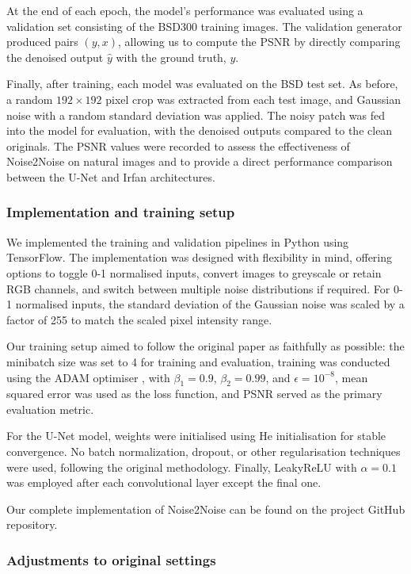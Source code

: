 At the end of each epoch, the model's performance was evaluated using a validation set consisting of the BSD300 training images. The validation generator produced pairs $(y, x)$, allowing us to compute the PSNR by directly comparing the denoised output $\hat{y}$ with the ground truth, $y$.

Finally, after training, each model was evaluated on the BSD test set. As before, a random $192 \times 192$ pixel crop was extracted from each test image, and Gaussian noise with a random standard deviation was applied. The noisy patch was fed into the model for evaluation, with the denoised outputs compared to the clean originals. The PSNR values were recorded to assess the effectiveness of Noise2Noise on natural images and to provide a direct performance comparison between the U-Net and Irfan architectures.

\subsubsection{Implementation and training setup}

We implemented the training and validation pipelines in Python using TensorFlow. The implementation was designed with flexibility in mind, offering options to toggle 0-1 normalised inputs, convert images to greyscale or retain RGB channels, and switch between multiple noise distributions if required. For 0-1 normalised inputs, the standard deviation of the Gaussian noise was scaled by a factor of 255 to match the scaled pixel intensity range.

Our training setup aimed to follow the original paper as faithfully as possible: the minibatch size was set to 4 for training and evaluation, training was conducted using the ADAM optimiser \cite{kingma_adam_2014}, with $\beta_1 = 0.9$, $\beta_2 = 0.99$, and $\epsilon = 10^{-8}$, mean squared error was used as the loss function, and PSNR served as the primary evaluation metric. 

For the U-Net model, weights were initialised using He initialisation \cite{he_delving_2015} for stable convergence. No batch normalization, dropout, or other regularisation techniques were used, following the original methodology. Finally, LeakyReLU with $\alpha = 0.1$ \cite{maas_rectifier_2013} was employed after each convolutional layer except the final one.

Our complete implementation of Noise2Noise can be found on the project GitHub repository.

\subsubsection{Adjustments to original settings}

